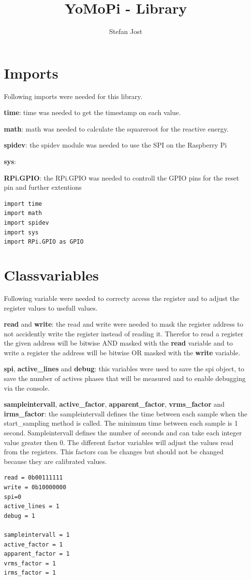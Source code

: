 \documentclass{scrartcl}  %
\title{YoMoPi - Library}
\author{Stefan Jost}
\begin{document}
\maketitle  %
\newpage
\tableofcontents
\newpage

\section{Imports}
Following imports were needed for this library.

\textbf{time}: time was needed to get the timestamp on each value.

\textbf{math}: math was needed to calculate the squareroot for the reactive energy.

\textbf{spidev}: the spidev module was needed to use the SPI on the Raspberry Pi

\textbf{sys}: 

\textbf{RPi.GPIO}: the RPi.GPIO was needed to controll the GPIO pins for the reset pin and further extentions

\begin{lstlisting}
import time
import math
import spidev
import sys
import RPi.GPIO as GPIO 
\end{lstlisting}
 
\section{Classvariables}

Following variable were needed to correcty access the register and to adjust the register values to usefull values. 

\textbf{read} and \textbf{write}: the read and write were needed to mask the register address to not accidently write the register instead of reading it. Therefor to read a register the given address will be bitwise AND masked with the \textbf{read} variable and to write a register the address will be bitwise OR masked with the \textbf{write} variable.

\textbf{spi}, \textbf{active_lines} and \textbf{debug}: this variables were used to save the spi object, to save the number of actives phases that will be measured and to enable debugging via the console.

\textbf{sampleintervall}, \textbf{active_factor}, \textbf{apparent_factor}, \textbf{vrms_factor} and \textbf{irms_factor}: the sampleintervall defines the time between each sample when the start_sampling method is called. The minimum time between each sample is 1 second. Sampleintervall defines the number of seconds and can take each integer value greater then 0. The different factor variables will adjust the values read from the registers. This factors can be changes but should not be changed because they are calibrated values.
\begin{lstlisting}
read = 0b00111111
write = 0b10000000
spi=0
active_lines = 1
debug = 1
	
sampleintervall = 1
active_factor = 1
apparent_factor = 1
vrms_factor = 1
irms_factor = 1
\end{lstlisting}
    
\end{document}
